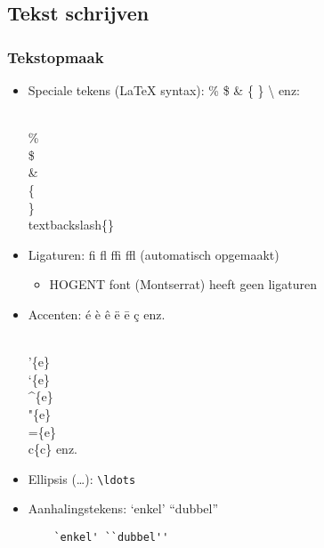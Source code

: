 \documentclass[aspectratio=169]{beamer}
\begin{document}
\subsection{Tekst schrijven}

\begin{frame}[fragile]
 \frametitle{Tekstopmaak}

 \begin{itemize}
    \item<+-> Speciale tekens ({\LaTeX} syntax): \% \$ \& \{ \} \textbackslash{} enz: \\
    \begin{semiverbatim}
      \\\% \\\$ \\\& \\\{ \\\} \\textbackslash\{\}
    \end{semiverbatim}
    \item<+-> Ligaturen: \textrm{fi fl ffi ffl} (automatisch opgemaakt)
    \begin{itemize}
      \item HOGENT font (Montserrat) heeft geen ligaturen
    \end{itemize}
    \item<+-> Accenten: \'{e} \`{e} \^{e} \"{e} \={e} \c{c} enz.
    \begin{semiverbatim}
      \\'\{e\} \\`\{e\} \\^\{e\} \\"\{e\} \\=\{e\} \\c\{c\} enz.
    \end{semiverbatim}
    \item<+-> Ellipsis (\ldots): \texttt{\textbackslash{}ldots}
    \item<+-> Aanhalingstekens: `enkel' ``dubbel''
    \begin{verbatim}
    `enkel' ``dubbel''
    \end{verbatim}
  \end{itemize}
\end{frame}
\end{document}
